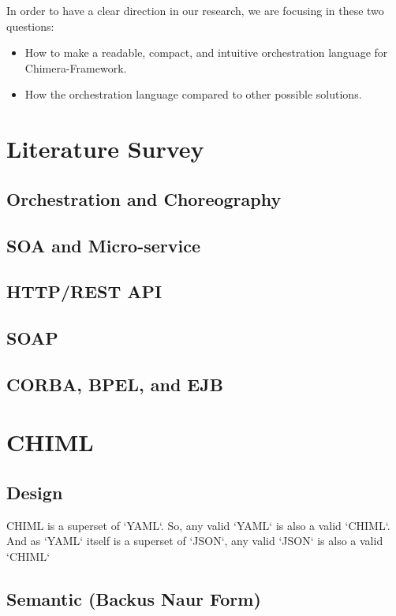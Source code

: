 \documentclass[conference]{IEEEtran}
\begin{document}
In order to have a clear direction in our research, we are focusing in these two questions:

\begin{itemize}
    \item How to make a readable, compact, and intuitive orchestration language for Chimera-Framework.
    \item How the orchestration language compared to other possible solutions.
\end{itemize}

\section{Literature Survey}

\subsection{Orchestration and Choreography}

\subsection{SOA and Micro-service}

\subsection{HTTP/REST API}

\subsection{SOAP}

\subsection{CORBA, BPEL, and EJB}

\section{CHIML}

\subsection{Design}

{\lt CHIML} is a superset of `YAML`. So, any valid `YAML` is also a valid `CHIML`. And as `YAML` itself is a superset of `JSON`, any valid `JSON` is also a valid `CHIML`

\subsection{Semantic (Backus Naur Form)}
\end{document}
